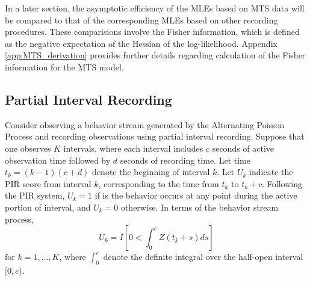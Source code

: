 \documentclass[man, noextraspace, floatsintext]{apa6}\usepackage[]{graphicx}\usepackage[]{color}
\begin{document}
In a later section, the asymptotic efficiency of the MLEs based on MTS data will be compared to that of the corresponding MLEs based on other recording procedures. These comparisions involve the Fisher information, which is defined as the negative expectation of the Hessian of the log-likelihood. Appendix \ref{app:MTS_derivation} provides further details regarding calculation of the Fisher information for the MTS model.

\subsection{Partial Interval Recording}
\label{subsec:PIR}

Consider observing a behavior stream generated by the Alternating Poisson Process and recording observations using partial interval recording. 
Suppose that one observes $K$ intervals, where each interval includes $c$ seconds of active observation time followed by $d$ seconds of recording time. 
Let time $t_k = (k-1)(c + d)$ denote the beginning of interval $k$. Let $U_k$ indicate the PIR score from interval $k$, corresponding to the time from $t_k$ to $t_k + c$. 
Following the PIR system, $U_k = 1$ if is the behavior occurs at any point during the active portion of interval, and $U_k = 0$ otherwise. 
In terms of the behavior stream process, 
\begin{equation}
U_k = I\left[ 0 < \int_0^{c} Z\left(t_k + s \right) ds\right]
\end{equation}
for $k = 1,...,K$, where $\int_0^{c}$ denote the definite integral over the half-open interval $[0,c)$.
\end{document}

